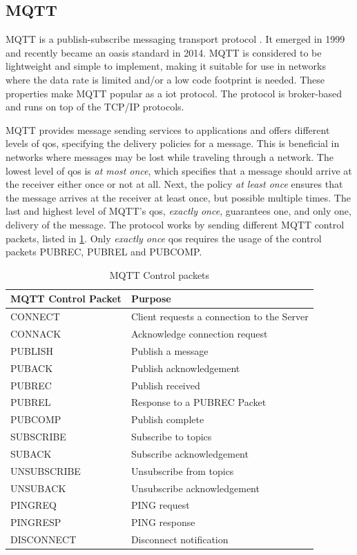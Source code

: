 \subsection{MQTT}

MQTT is a publish-subscribe messaging transport protocol \cite{oasis-mqtt}. It
emerged in 1999 and recently became an \gls{oasis} standard in 2014. MQTT is
considered to be lightweight and simple to implement, making it suitable for
use in networks where the data rate is limited and/or a low code footprint is
needed. These properties make MQTT popular as a \gls{iot} protocol. The protocol
is broker-based and runs on top of the TCP/IP protocols.

MQTT provides message sending services to applications and offers different
levels of \gls{qos}, specifying the delivery policies for a message. This is
beneficial in networks where messages may be lost while traveling through a
network. The lowest level of \gls{qos} is \textit{at most once}, which specifies
that a message should arrive at the receiver either once or not at all. Next,
the policy \textit{at least once} ensures that the message arrives at the
receiver at least once, but possible multiple times. The last and highest level
of MQTT's \gls{qos}, \textit{exactly once}, guarantees one, and only one,
delivery of the message. The protocol works by sending different MQTT control
packets, listed in \cref{table:mqtt-packets}. Only \textit{exactly once}
\gls{qos} requires the usage of the control packets PUBREC, PUBREL and PUBCOMP.

\begin{table}[h]
\begin{tabularx}{\textwidth}{| X | X |}
\hline
  \textbf{MQTT Control Packet} & \textbf{Purpose} \\ \hline
  CONNECT & Client requests a connection to the Server \\ \hline
  CONNACK & Acknowledge connection request \\ \hline
  PUBLISH & Publish a message \\ \hline
  PUBACK & Publish acknowledgement \\ \hline
  PUBREC &  Publish received \\ \hline
  PUBREL & Response to a PUBREC Packet \\ \hline
  PUBCOMP & Publish complete \\ \hline
  SUBSCRIBE & Subscribe to topics \\ \hline
  SUBACK & Subscribe acknowledgement\\ \hline
  UNSUBSCRIBE & Unsubscribe from topics\\ \hline
  UNSUBACK & Unsubscribe acknowledgement \\ \hline
  PINGREQ & PING request \\ \hline
  PINGRESP & PING response \\ \hline
  DISCONNECT & Disconnect notification \\ \hline
\end{tabularx}
\caption{MQTT Control packets}
\label{table:mqtt-packets}
\end{table}


